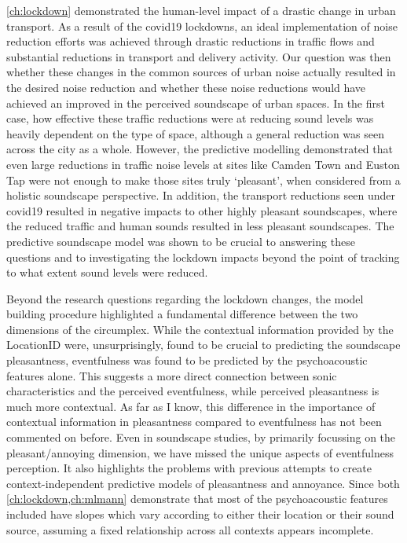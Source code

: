 \cref{ch:lockdown} demonstrated the human-level impact of a drastic change in urban transport. As a result of the \gls{covid19} lockdowns, an ideal implementation of noise reduction efforts was achieved through drastic reductions in traffic flows and substantial reductions in transport and delivery activity. Our question was then whether these changes in the common sources of urban noise actually resulted in the desired noise reduction and whether these noise reductions would have achieved an improved in the perceived soundscape of urban spaces. In the first case, how effective these traffic reductions were at reducing sound levels was heavily dependent on the type of space, although a general reduction was seen across the city as a whole. However, the predictive modelling demonstrated that even large reductions in traffic noise levels at sites like Camden Town and Euston Tap were not enough to make those sites truly `pleasant', when considered from a holistic soundscape perspective. In addition, the transport reductions seen under \gls{covid19} resulted in negative impacts to other highly pleasant soundscapes, where the reduced traffic and human sounds resulted in less pleasant soundscapes. The predictive soundscape model was shown to be crucial to answering these questions and to investigating the lockdown impacts beyond the point of tracking to what extent sound levels were reduced.

Beyond the research questions regarding the lockdown changes, the model building procedure highlighted a fundamental difference between the two dimensions of the circumplex. While the contextual information provided by the LocationID were, unsurprisingly, found to be crucial to predicting the soundscape pleasantness, eventfulness was found to be predicted by the psychoacoustic features alone. This suggests a more direct connection between sonic characteristics and the perceived eventfulness, while perceived pleasantness is much more contextual. As far as I know, this difference in the importance of contextual information in pleasantness compared to eventfulness has not been commented on before. Even in soundscape studies, by primarily focussing on the pleasant/annoying dimension, we have missed the unique aspects of eventfulness perception. It also highlights the problems with previous attempts to create context-independent predictive models of pleasantness and annoyance. Since both \cref{ch:lockdown,ch:mlmann} demonstrate that most of the psychoacoustic features included have slopes which vary according to either their location or their sound source, assuming a fixed relationship across all contexts appears incomplete.

